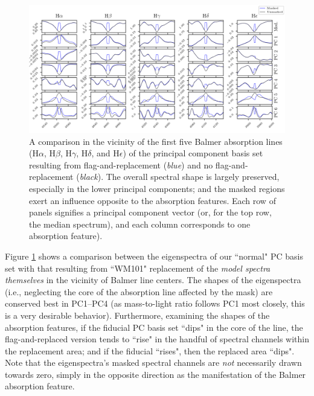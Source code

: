 \begin{figure}
    \centering
    \includegraphics[angle=90,height=0.95\textheight]{pcs_withmasking_compare}
    \caption[Balmer fit residuals using two masking strategies]{\fixspacing A comparison in the vicinity of the first five Balmer absorption lines (H$\alpha$, H$\beta$, H$\gamma$, H$\delta$, and H$\epsilon$) of the principal component basis set resulting from flag-and-replacement (\textit{blue}) and no flag-and-replacement (\textit{black}). The overall spectral shape is largely preserved, especially in the lower principal components; and the masked regions exert an influence opposite to the absorption features. Each row of panels signifies a principal component vector (or, for the top row, the median spectrum), and each column corresponds to one absorption feature).}
    \label{fig:pcs_withmasking_compare}
\end{figure}

Figure \ref{fig:pcs_withmasking_compare} shows a comparison between the eigenspectra of our ``normal" PC basis set with that resulting from ``WM101" replacement of the \emph{model spectra themselves} in the vicinity of Balmer line centers. The shapes of the eigenspectra (i.e., neglecting the core of the absorption line affected by the mask) are conserved best in PC1--PC4 (as mass-to-light ratio follows PC1 most closely, this is a very desirable behavior). Furthermore, examining the shapes of the absorption features, if the fiducial PC basis set ``dips" in the core of the line, the flag-and-replaced version tends to ``rise" in the handful of spectral channels within the replacement area; and if the fiducial ``rises", then the replaced area ``dips". Note that the eigenspectra's masked spectral channels are \textit{not} necessarily drawn towards zero, simply in the opposite direction as the manifestation of the Balmer absorption feature.

